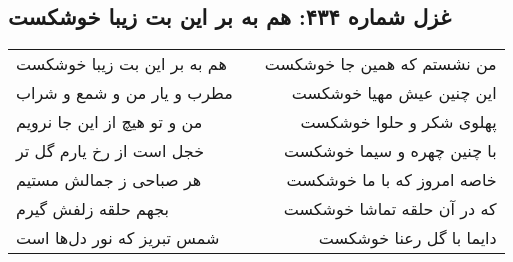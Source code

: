 \begin{center}
\section*{غزل شماره ۴۳۴: هم به بر این بت زیبا خوشکست}
\label{sec:0434}
\begin{longtable}{l p{0.5cm} r}
هم به بر این بت زیبا خوشکست
&&
من نشستم که همین جا خوشکست
\\
مطرب و یار من و شمع و شراب
&&
این چنین عیش مهیا خوشکست
\\
من و تو هیچ از این جا نرویم
&&
پهلوی شکر و حلوا خوشکست
\\
خجل است از رخ یارم گل تر
&&
با چنین چهره و سیما خوشکست
\\
هر صباحی ز جمالش مستیم
&&
خاصه امروز که با ما خوشکست
\\
بجهم حلقه زلفش گیرم
&&
که در آن حلقه تماشا خوشکست
\\
شمس تبریز که نور دل‌ها است
&&
دایما با گل رعنا خوشکست
\\
\end{longtable}
\end{center}

